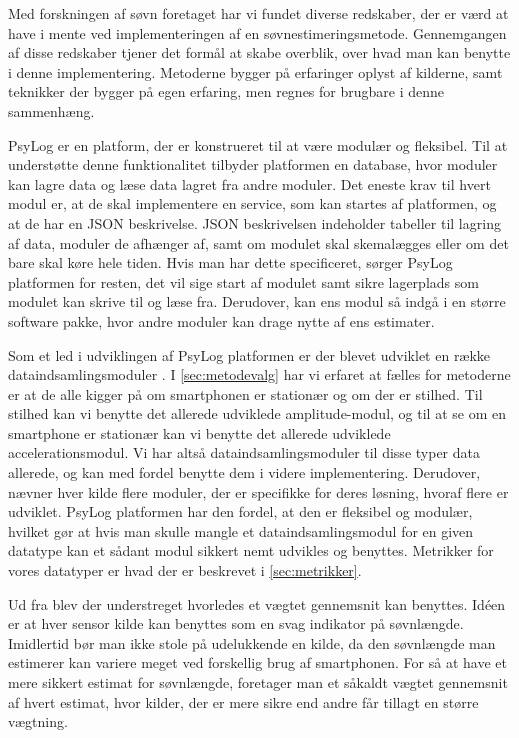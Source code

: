 Med forskningen af søvn foretaget har vi fundet diverse redskaber, der er værd at have i mente ved implementeringen af en søvnestimeringsmetode.
Gennemgangen af disse redskaber tjener det formål at skabe overblik, over hvad man kan benytte i denne implementering.
Metoderne bygger på erfaringer oplyst af kilderne, samt teknikker der bygger på egen erfaring, men regnes for brugbare i denne sammenhæng.

\begin{description}[style=nextline]
\item[PsyLog]
PsyLog er en platform, der er konstrueret til at være modulær og fleksibel.
Til at understøtte denne funktionalitet tilbyder platformen en database, hvor moduler kan lagre data og læse data lagret fra andre moduler.
Det eneste krav til hvert modul er, at de skal implementere en service, som kan startes af platformen, og at de har en JSON beskrivelse.
JSON beskrivelsen indeholder tabeller til lagring af data, moduler de afhænger af, samt om modulet skal skemalægges eller om det bare skal køre hele tiden.
Hvis man har dette specificeret, sørger PsyLog platformen for resten, det vil sige start af modulet samt sikre lagerplads som modulet kan skrive til og læse fra.
Derudover, kan ens modul så indgå i en større software pakke, hvor andre moduler kan drage nytte af ens estimater.

\item[Dataindsamlingsmoduler]
Som et led i udviklingen af PsyLog platformen er der blevet udviklet en række dataindsamlingsmoduler \citep{misc:faellesrapp}.
I \cref{sec:metodevalg} har vi erfaret at fælles for metoderne er at de alle kigger på om smartphonen er stationær og om der er stilhed. 
Til stilhed kan vi benytte det allerede udviklede amplitude-modul, og til at se om en smartphone er stationær kan vi benytte det allerede udviklede accelerationsmodul.
Vi har altså dataindsamlingsmoduler til disse typer data allerede, og kan med fordel benytte dem i videre implementering.
Derudover, nævner hver kilde flere moduler, der er specifikke for deres løsning, hvoraf flere er udviklet.
PsyLog platformen har den fordel, at den er fleksibel og modulær, hvilket gør at hvis man skulle mangle et dataindsamlingsmodul for en given datatype kan et sådant modul sikkert nemt udvikles og benyttes.
Metrikker for vores datatyper er hvad der er beskrevet i \cref{sec:metrikker}.

\item[Vægtet gennemsnit]
Ud fra \citet{6563918} blev der understreget hvorledes et vægtet gennemsnit kan benyttes.
Idéen er at hver sensor kilde kan benyttes som en svag indikator på søvnlængde.
Imidlertid bør man ikke stole på udelukkende en kilde, da den søvnlængde man estimerer kan variere meget ved forskellig brug af smartphonen.
For så at have et mere sikkert estimat for søvnlængde, foretager man et såkaldt vægtet gennemsnit af hvert estimat, hvor kilder, der er mere sikre end andre får tillagt en større vægtning.


\end{description}

